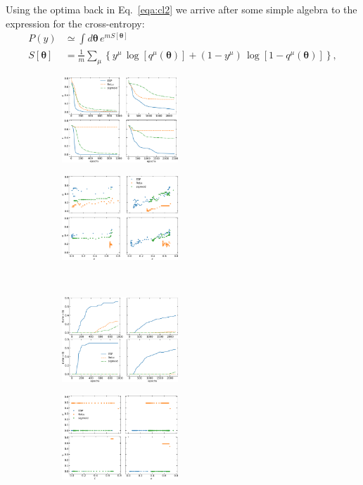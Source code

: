\documentclass{article}
\begin{document}
%
Using the optima back in Eq.~\eqref{eqa:cl2} we arrive after some simple algebra to the expression for the cross-entropy:
%
\begin{align} \label{eq:cl3}
P(y) &\simeq \int d\boldsymbol{\theta} \, e^{m S[\boldsymbol{\theta}]} \\ \nonumber
S[\boldsymbol{\theta}] &= \frac{1}{m} \sum_{\mu} \left\{ y^{\mu} \, \log [ q^{\mu}( \boldsymbol{\theta} ) ] + (1-y^{\mu}) \, \log [1-q^{\mu}( \boldsymbol{\theta}) ] \right\},
\end{align}
%
%
\begin{figure}[t!]
\centering
	\begin{subfigure}[]{ }
	\includegraphics[width = 0.48\textwidth]{costs.pdf}
	\label{fig:cost1}
  \end{subfigure}
	\begin{subfigure}[]{}
 		\includegraphics[width = 0.48\textwidth]{alpha.pdf}
		\label{fig:index1}
	\end{subfigure}
  ~
  \begin{subfigure}[]{}
	\includegraphics[width= 0.48\textwidth]{residues.pdf}
	\label{fig:res}
	\end{subfigure}
  \begin{subfigure}[]{}
	\includegraphics[width= 0.48\textwidth]{gamma.pdf}
	\label{fig:gamma}
	\end{subfigure}


\end{figure}
\end{document}
